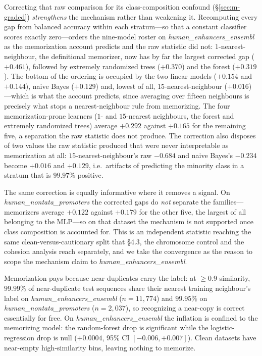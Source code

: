 \documentclass[webpdf,modern,large,namedate]{oup-authoring-template}%
\begin{document}
Correcting that raw comparison for its class-composition confound (\S\ref{sec:m-graded}) \emph{strengthens} the mechanism rather than weakening it. Recomputing every gap from balanced accuracy within each stratum---so that a constant classifier scores exactly zero---orders the nine-model roster on \textit{human\_enhancers\_ensembl} as the memorization account predicts and the raw statistic did not: $1$-nearest-neighbour, the definitional memorizer, now has by far the largest corrected gap ($+0.461$), followed by extremely randomized trees ($+0.370$) and the forest ($+0.319$). The bottom of the ordering is occupied by the two linear models ($+0.154$ and $+0.144$), naive Bayes ($+0.129$) and, lowest of all, $15$-nearest-neighbour ($+0.016$)---which is what the account predicts, since averaging over fifteen neighbours is precisely what stops a nearest-neighbour rule from memorizing. The four memorization-prone learners ($1$- and $15$-nearest neighbours, the forest and extremely randomized trees) average $+0.292$ against $+0.165$ for the remaining five, a separation the raw statistic does not produce. The correction also disposes of two values the raw statistic produced that were never interpretable as memorization at all: $15$-nearest-neighbour's raw $-0.684$ and naive Bayes's $-0.234$ become $+0.016$ and $+0.129$, i.e.\ artifacts of predicting the minority class in a stratum that is $99.97\%$ positive.

The same correction is equally informative where it removes a signal. On \textit{human\_nontata\_promoters} the corrected gaps do \emph{not} separate the families---memorizers average $+0.122$ against $+0.179$ for the other five, the largest of all belonging to the MLP---so on that dataset the mechanism is not supported once class composition is accounted for. This is an independent statistic reaching the same clean-versus-cautionary split that \S4.3, the chromosome control and the cohesion analysis reach separately, and we take the convergence as the reason to scope the mechanism claim to \textit{human\_enhancers\_ensembl}.

Memorization pays because near-duplicates carry the label: at $\ge0.9$ similarity, $99.99\%$ of near-duplicate test sequences share their nearest training neighbour's label on \textit{human\_enhancers\_ensembl} ($n=11{,}774$) and $99.95\%$ on \textit{human\_nontata\_promoters} ($n=2{,}037$), so recognizing a near-copy is correct essentially for free. On \textit{human\_enhancers\_ensembl} the inflation is confined to the memorizing model: the random-forest drop is significant while the logistic-regression drop is null ($+0.0004$, 95\% CI $[-0.006,+0.007]$). Clean datasets have near-empty high-similarity bins, leaving nothing to memorize.
\end{document}
